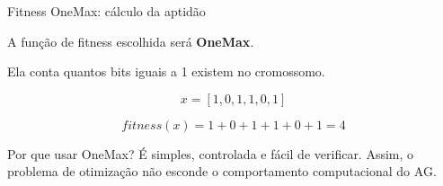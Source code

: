 \documentclass[aspectratio=169,11pt]{beamer}
\begin{document}
\begin{frame}{Fitness OneMax: cálculo da aptidão}

    \vspace{0.10cm}

    A função de fitness escolhida será \textbf{OneMax}.

    \vspace{0.18cm}

    Ela conta quantos bits iguais a 1 existem no cromossomo.

    \vspace{0.25cm}

    \[
        x = [1,0,1,1,0,1]
    \]

    \[
        fitness(x) = 1 + 0 + 1 + 1 + 0 + 1 = 4
    \]

    \vspace{0.15cm}

    \begin{questionbox}{Por que usar OneMax?}
        É simples, controlada e fácil de verificar. Assim, o problema de
        otimização não esconde o comportamento computacional do AG.
    \end{questionbox}

\end{frame}

\end{document}
